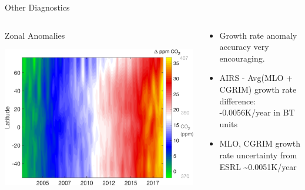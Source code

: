\documentclass[10pt,t]{beamer}
\begin{document}
\begin{frame}[label={sec:org19445da}]{Other \cd Diagnostics}
\vspace{-0.2in}

\begin{columns}
\begin{column}{0.5\columnwidth}
\begin{block}{\footnotesize Zonal Anomalies}
\vspace{-0.1in}
\begin{center}
\includegraphics[width=0.9\linewidth]{./Figs/Png/co2_anom_image_lat_vs_time.png}
\end{center}
\end{block}
\end{column}

\begin{column}{0.5\columnwidth}
\begin{block}{}
\vspace{-0.2in}
\begin{footnotesize}
\begin{itemize}
\item Growth rate anomaly accuracy very encouraging.
\item AIRS - Avg(MLO + CGRIM) growth rate difference: -0.0056K/year in BT units
\item MLO, CGRIM growth rate uncertainty from ESRL \textasciitilde{}0.0051K/year
\end{itemize}
\end{footnotesize}
\end{block}
\end{column}
\end{columns}
\end{frame}
\end{document}
